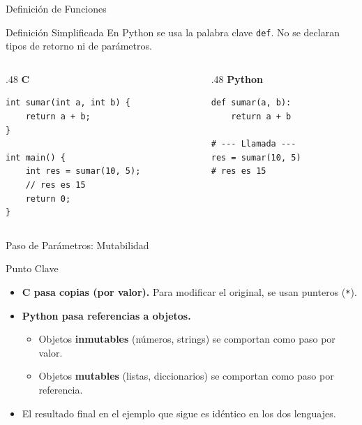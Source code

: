 \documentclass{beamer}
\begin{document}
\begin{frame}[fragile]{Definición de Funciones}
  \begin{block}{Definición Simplificada}
    En Python se usa la palabra clave \texttt{def}. No se declaran tipos de retorno ni de parámetros.
  \end{block}
  \begin{columns}[T]
    \begin{column}{.48\textwidth}
      \centering\textbf{C}
      \begin{verbatim}
int sumar(int a, int b) {
    return a + b;
}

int main() {
    int res = sumar(10, 5);
    // res es 15
    return 0;
}
      \end{verbatim}
    \end{column}
    \begin{column}{.48\textwidth}
      \centering\textbf{Python}
      \begin{verbatim}
def sumar(a, b):
    return a + b

# --- Llamada ---
res = sumar(10, 5)
# res es 15
      \end{verbatim}
    \end{column}
  \end{columns}
\end{frame}

\begin{frame}{Paso de Parámetros: Mutabilidad}
  \begin{alertblock}{Punto Clave}
    \begin{itemize}
      \item \textbf{C pasa copias (por valor).} Para modificar el original, se usan punteros (\texttt{*}).
      \item \textbf{Python pasa referencias a objetos.}
      \begin{itemize}
        \item Objetos \textbf{inmutables} (números, strings) se comportan como paso por valor.
        \item Objetos \textbf{mutables} (listas, diccionarios) se comportan como paso por referencia.
      \end{itemize}
      \item El resultado final en el ejemplo que sigue es idéntico en los dos lenguajes.
    \end{itemize}
  \end{alertblock}
\end{frame}
\end{document}
